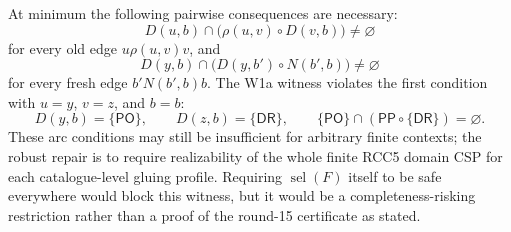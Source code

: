 \documentclass[11pt]{article}
\newcommand{\PP}{\mathsf{PP}}
\newcommand{\PO}{\mathsf{PO}}
\newcommand{\DR}{\mathsf{DR}}
\newcommand{\sel}{\operatorname{sel}}
\begin{document}
At minimum the following pairwise consequences are necessary:
\[
  D(u,b)\cap\bigl(\rho(u,v)\circ D(v,b)\bigr)\ne\varnothing
\]
for every old edge $u\rho(u,v)v$, and
\[
  D(y,b)\cap\bigl(D(y,b')\circ N(b',b)\bigr)\ne\varnothing
\]
for every fresh edge $b'N(b',b)b$.  The W1a witness violates the first
condition with $u=y$, $v=z$, and $b=b$:
\[
  D(y,b)=\{\PO\},\qquad D(z,b)=\{\DR\},\qquad
  \{\PO\}\cap(\PP\circ\{\DR\})=\varnothing.
\]
These arc conditions may still be insufficient for arbitrary finite
contexts; the robust repair is to require realizability of the whole finite
RCC5 domain CSP for each catalogue-level gluing profile.  Requiring
$\sel(F)$ itself to be safe everywhere would block this witness, but it
would be a completeness-risking restriction rather than a proof of the
round-15 certificate as stated.
\end{document}
